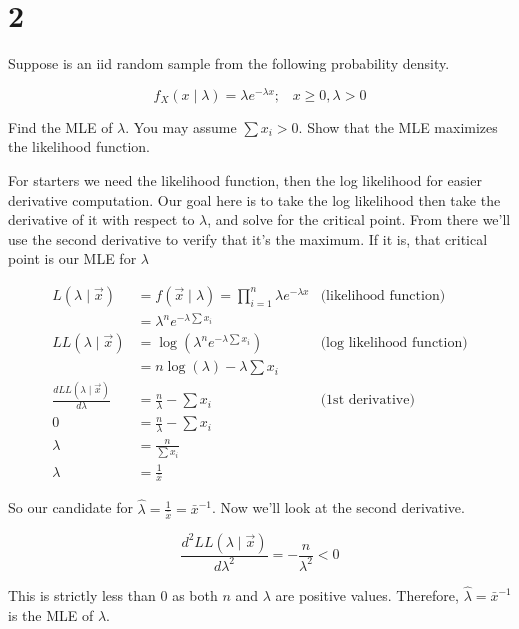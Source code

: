 \section{2}

Suppose \rs is an iid random sample from the following probability density.

\[f_X(x \mid \lambda) = \lambda e^{-\lambda x}; \;\;\; x \geq 0, \lambda > 0\]

Find the MLE of $\lambda$. You may assume $\sum x_i > 0$. Show that the MLE maximizes the likelihood function.

For starters we need the likelihood function, then the log likelihood for easier derivative computation. Our goal here is to take the log likelihood then take the derivative of it with respect to $\lambda$, and solve for the critical point. From there we'll use the second derivative to verify that it's the maximum. If it is, that critical point is our MLE for $\lambda$

\begin{align*}
	L(\lambda \mid \vec{x}) &= f(\vec{x} \mid \lambda) = \prod_{i=1}^n \lambda e^{-\lambda x} & \text{(likelihood function)} \\
	&= \lambda^n e^{-\lambda \sum x_i} \\
	LL(\lambda \mid \vec{x}) &= \log\left(  \lambda^n e^{-\lambda \sum x_i} \right) & \text{(log likelihood function)} \\
	&= n \log(\lambda) - \lambda \sum x_i \\
	\frac{d LL(\lambda \mid \vec{x})}{d\lambda} &= \frac{n}{\lambda} - \sum x_i & \text{(1st derivative)} \\
	0 &= \frac{n}{\lambda} - \sum x_i \\
	\lambda &= \frac{n}{\sum x_i} \\
	\lambda &= \frac{1}{\bar{x}}
\end{align*}

So our candidate for $\hat{\lambda} = \frac{1}{\bar{x}} = \bar{x}^{-1}$. Now we'll look at the second derivative.

\[
	\frac{d^2 LL(\lambda \mid \vec{x})}{d\lambda^2} = -\frac{n}{\lambda^2} < 0 
\]

This is strictly less than $0$ as both $n$ and $\lambda$ are positive values. Therefore, $\hat{\lambda} = \bar{x}^{-1}$ is the MLE of $\lambda$.
